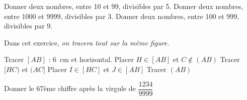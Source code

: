 \documentclass[../Cours.tex]{subfiles}
\begin{document}
\begin{questions}
        \question Donner deux nombres, entre 10 et 99, divisibles par 5.
        \question Donner deux nombres, entre 1000 et 9999, divisibles par 3.
        \question Donner deux nombres, entre 100 et 999, divisibles par 9.

    Dans cet exercice, \emph{on tracera tout sur la même figure.}
    \begin{multicols}{2}
        \question Tracer $[AB]$ : \qty{6}{\cm} et horizontal.
        \question Placer $H \in [AB]$ et $C \notin (AB) $
        \question Tracer $[HC)$ et $(AC]$
        \question Placer $I \in [HC]$ et $J \in [AB]$
        \question Tracer $(AB)$
    \end{multicols}

    Donner le 67ème chiffre après la virgule de $\dfrac{1234}{9999}$
\end{questions}
\end{document}
